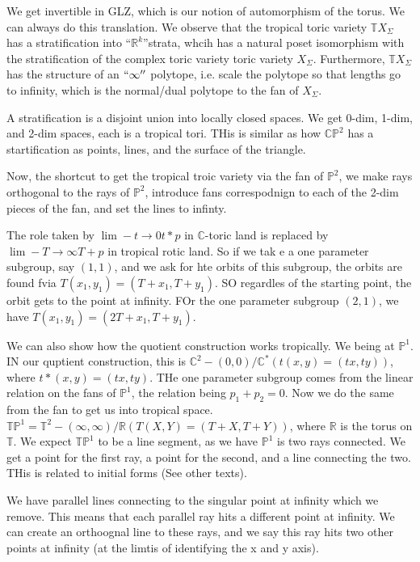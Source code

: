 \documentclass[12pt]{memoir}
\theoremstyle{definition}
\def\RR{{\mathbb R}}
\def\CC{{\mathbb C}}
\def\TT{{\mathbb T}}
\def\PP{{\mathbb P}}
\begin{document}
We get invertible in GLZ, which is our notion of automorphism of the torus. We can always do this translation. We observe that the tropical toric variety $\TT X_\Sigma$ has a stratification into ``$\RR^k$''strata, whcih has a natural poset isomorphism with the stratification of the complex toric variety toric variety $X_\Sigma$. 
Furthermore, $\TT X_\Sigma$ has the structure of an $``\infty''$ polytope, i.e. scale the polytope so that lengths go to infinity, which is the normal/dual polytope to the fan of $X_\Sigma$.

A stratification is a disjoint union into locally closed spaces. We get 0-dim, 1-dim, and 2-dim spaces, each is a tropical tori. THis is similar as how $\CC\PP^2$ has a startification as points, lines, and the surface of the triangle. 



Now, the shortcut to get the tropical troic variety via the fan of $\PP^2$, we make rays orthogonal to the rays of $\PP^2$, introduce fans correspodnign to each of the 2-dim pieces of the fan, and set the lines to infinty.

The role taken by $\lim\limits-{t\rightarrow 0} t*p$ in $\CC$-toric land is replaced by $\lim\limits-{T \rightarrow \infty} T+p$ in tropical rotic land. So if we tak e a one parameter subgroup, say $(1,1)$, and we ask for hte orbits of this subgroup, the orbits are found fvia $T(x_1,y_1) = (T+x_1,T+y_1)$. SO regardles of the starting point, the orbit gets to the point at infinity. FOr the one parameter subgroup $(2,1)$, we have $T(x_1,y_1) = (2T+x_1, T+y_1)$.



We can also show how the quotient construction works tropically. We being at $\PP^1$. IN our quptient construction, this is $\CC^2-(0,0)/\CC^*(t(x,y)=(tx,ty))$, where $t*(x,y)=(tx,ty)$. THe one parameter subgroup comes from the linear relation on the fans of $\PP^1$, the relation being $p_1+p_2=0$. Now we do the same from the fan to get us into tropical space. $\TT\PP^1 = \TT^2 -(\infty, \infty)/\RR (T(X,Y)=(T+X,T+Y))$, where $\RR$ is the torus on $\TT$. We expect $\TT\PP^1$ to be a line segment, as we have $\PP^1$ is two rays connected. We get a point for the first ray, a point for the second, and a line connecting the two. THis is related to initial forms (See other texts).


We have parallel lines connecting to the singular point at infinity which we remove. This means that each parallel ray hits a different point at infinity. We can create an orthoognal line to these rays, and we say this ray hits two other points at infinity (at the limtis of identifying the x and y axis).
\end{document}
